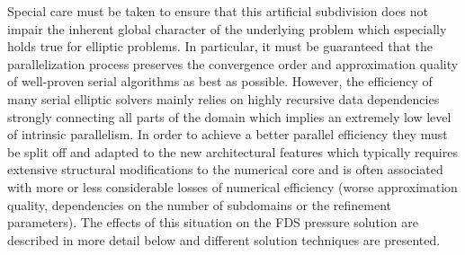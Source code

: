 Special care must be taken to ensure that this artificial subdivision does not impair the inherent global character of the underlying problem which especially holds true for elliptic problems. In particular, it must be guaranteed that the parallelization process preserves the convergence order and approximation quality of well-proven serial algorithms as best as possible.
%
However, the efficiency of many serial elliptic solvers mainly relies on highly recursive data dependencies strongly connecting all parts of the domain which implies an extremely low level of intrinsic parallelism. 
In order to achieve a better parallel efficiency they must be split off and adapted to the new architectural features which typically requires extensive structural modifications to the numerical core and is often
associated with more or less considerable losses of numerical efficiency (worse approximation quality, dependencies on the number of subdomains or the refinement parameters).
The effects of this situation on the FDS pressure solution are described in more detail below and different solution techniques are presented.



